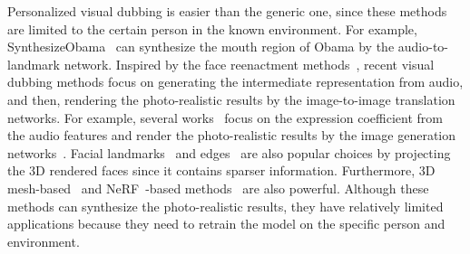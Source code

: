 Personalized visual dubbing is easier than the generic one, since these methods are limited to the certain person in the known environment.
For example, SynthesizeObama~\cite{obama} can synthesize the mouth region of Obama by the audio-to-landmark network. Inspired by the face reenactment methods~\cite{dvp, thies2019deferred}, recent visual dubbing methods focus on generating the intermediate representation from audio, and then, rendering the photo-realistic results by the image-to-image translation networks. For example, several works~{\cite{NVP, AudioDVP,zhang2021facial}} focus on the expression coefficient from the audio features and render the photo-realistic results by the image generation networks~\cite{thies2019deferred, dvp, vid2vid}. Facial landmarks~\cite{lu2021live} and edges~\cite{EVP} are also popular choices by projecting the 3D rendered faces since it contains sparser information.
Furthermore, 3D mesh-based~\cite{lipsync3d} and NeRF~\cite{nerf}-based methods~\cite{adnerf} are also powerful.
Although these methods can synthesize the photo-realistic results, they have relatively limited applications because they need to retrain the model on the specific person and environment.

\nocite{wang2021hfgi}

